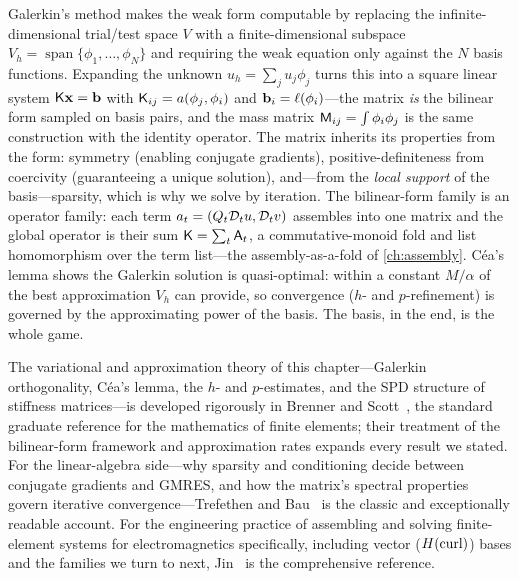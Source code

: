 \summarysection
Galerkin's method makes the weak form computable by replacing the
infinite-dimensional trial/test space $V$ with a finite-dimensional subspace
$V_h=\operatorname{span}\{\phi_1,\dots,\phi_N\}$ and requiring the weak equation
only against the $N$ basis functions. Expanding the unknown $u_h=\sum_j u_j\phi_j$
turns this into a square linear system $\mathsf{K}\mathbf{x}=\mathbf{b}$ with
$\mathsf{K}_{ij}=a(\phi_j,\phi_i)$ and $\mathbf{b}_i=\ell(\phi_i)$---the matrix \emph{is}
the bilinear form sampled on basis pairs, and the mass matrix
$\mathsf{M}_{ij}=\int\phi_i\phi_j$ is the same construction with the identity
operator. The matrix inherits its properties from the form: symmetry (enabling
conjugate gradients), positive-definiteness from coercivity (guaranteeing a unique
solution), and---from the \emph{local support} of the basis---sparsity, which is
why we solve by iteration. The bilinear-form family is an operator family: each
term $a_t=(Q_t\mathcal{D}_t u,\mathcal{D}_t v)$ assembles into one matrix and the global
operator is their sum $\mathsf{K}=\sum_t\mathsf{A}_t$, a commutative-monoid fold and
list homomorphism over the term list---the assembly-as-a-fold of \cref{ch:assembly}.
Céa's lemma shows the Galerkin solution is quasi-optimal: within a constant
$M/\alpha$ of the best approximation $V_h$ can provide, so convergence ($h$- and
$p$-refinement) is governed by the approximating power of the basis. The basis,
in the end, is the whole game.

\furtherreading
The variational and approximation theory of this chapter---Galerkin orthogonality,
Céa's lemma, the $h$- and $p$-estimates, and the SPD structure of stiffness
matrices---is developed rigorously in Brenner and Scott~\citep{brennerscott2008},
the standard graduate reference for the mathematics of finite elements; their
treatment of the bilinear-form framework and approximation rates expands every
result we stated. For the linear-algebra side---why sparsity and conditioning
decide between conjugate gradients and GMRES, and how the matrix's spectral
properties govern iterative convergence---Trefethen and Bau~\citep{trefethenbau1997}
is the classic and exceptionally readable account. For the engineering
practice of assembling and solving finite-element systems for electromagnetics
specifically, including vector ($H(\mathrm{curl})$) bases and the families we turn to next,
Jin~\citep{jin2014} is the comprehensive reference.

